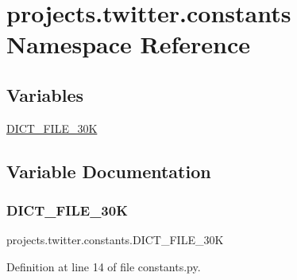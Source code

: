 \hypertarget{namespaceprojects_1_1twitter_1_1constants}{}\section{projects.\+twitter.\+constants Namespace Reference}
\label{namespaceprojects_1_1twitter_1_1constants}
\subsection*{Variables}
\begin{DoxyCompactItemize}
\item 
\hyperlink{namespaceprojects_1_1twitter_1_1constants_afbf10ad55e45d02a1592c41069aae88b}{D\+I\+C\+T\+\_\+\+F\+I\+L\+E\+\_\+30K}
\end{DoxyCompactItemize}


\subsection{Variable Documentation}
\mbox{\label{namespaceprojects_1_1twitter_1_1constants_afbf10ad55e45d02a1592c41069aae88b}} 
\subsubsection{\texorpdfstring{D\+I\+C\+T\+\_\+\+F\+I\+L\+E\+\_\+30K}{DICT\_FILE\_30K}}
{\footnotesize\ttfamily projects.\+twitter.\+constants.\+D\+I\+C\+T\+\_\+\+F\+I\+L\+E\+\_\+30K}



Definition at line 14 of file constants.\+py.

